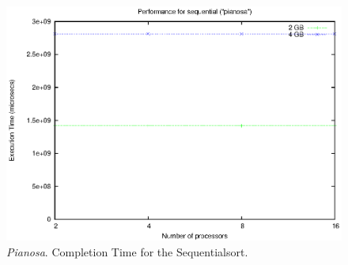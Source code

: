 \begin{figure}[t]
    \begin{center}
        \includegraphics[scale=0.6]{plots/test_01_pianosa/NxTxM/sequential_pianosa_NxTxM_huge}
    \end{center}
    \caption{\textit{Pianosa}. Completion Time for the Sequentialsort.}
    \label{sequential-pianosa}
\end{figure}

